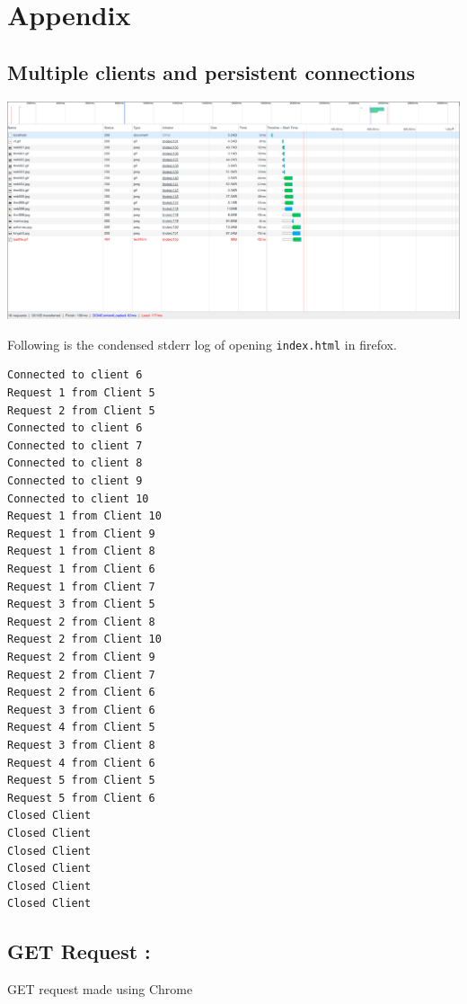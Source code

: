 \documentclass[11pt]{article}
\begin{document}
\section{Appendix}
\label{sec:orgheadline28}
\subsection{Multiple clients and persistent connections}
\label{sec:orgheadline10}
\label{orgtarget1}
\includegraphics[width=18cm]{./multipleclients.png}


\label{orgtarget2}
\noindent Following is the condensed stderr log of opening \texttt{index.html} in firefox.

\begin{verbatim}
Connected to client 6
Request 1 from Client 5
Request 2 from Client 5
Connected to client 6
Connected to client 7
Connected to client 8
Connected to client 9
Connected to client 10
Request 1 from Client 10
Request 1 from Client 9
Request 1 from Client 8
Request 1 from Client 6
Request 1 from Client 7
Request 3 from Client 5
Request 2 from Client 8
Request 2 from Client 10
Request 2 from Client 9
Request 2 from Client 7
Request 2 from Client 6
Request 3 from Client 6
Request 4 from Client 5
Request 3 from Client 8
Request 4 from Client 6
Request 5 from Client 5
Request 5 from Client 6
Closed Client
Closed Client
Closed Client
Closed Client
Closed Client
Closed Client
\end{verbatim}

\subsection{GET Request :}
\label{sec:orgheadline12}
GET request made using Chrome
\end{document}
